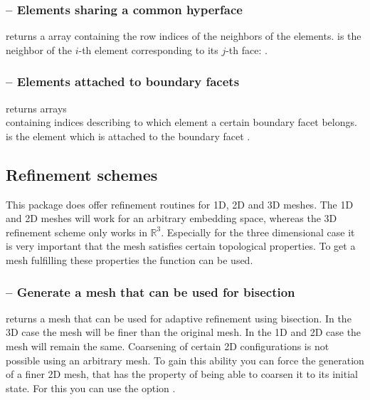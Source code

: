 \documentclass[twoside,11pt,a4paper]{article} %
\begin{document}
\subsubsection*{\texorpdfstring{ --}{} Elements sharing a common hyperface}
 returns a  array containing the row indices of the neighbors of the elements.
 is the neighbor of the $i$-th element corresponding to its $j$-th face: .
\subsubsection*{\texorpdfstring{ --}{} Elements attached to boundary facets}
 returns arrays \\  containing indices describing to which element a certain boundary facet belongs.\\
 is the element which is attached to the boundary facet .


\subsection{Refinement schemes}
This package does offer refinement routines for 1D, 2D and 3D meshes. The 1D and 2D meshes will work for an arbitrary embedding space, whereas the 3D refinement scheme only works in $\mathbb{R}^3$.
Especially for the three dimensional case it is very important that the mesh satisfies certain topological properties. To get a mesh fulfilling these properties the function  can be used.

\subsubsection*{\texorpdfstring{ --  }{} Generate a mesh that can be used for bisection}
 returns a mesh that can be used for adaptive refinement using bisection.
In the 3D case the mesh will be finer than the original mesh. In the 1D and 2D case the mesh will remain the same. Coarsening of certain 2D configurations is not possible using an arbitrary mesh. To gain this ability you can force the generation of a finer 2D mesh, that has the property of being able to coarsen it to its initial state.
For this you can use the option .
\end{document}

